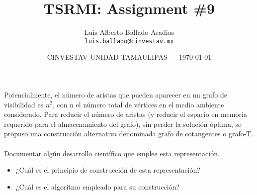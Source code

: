 \documentclass{article}
\title{TSRMI: Assignment \#9} %
\author{Luis Alberto Ballado Aradias\\ \texttt{luis.ballado@cinvestav.mx}} %
\date{CINVESTAV UNIDAD TAMAULIPAS --- \today} %
\begin{document}
\maketitle %



Potencialmente, el número de aristas que pueden aparecer en un grafo de visibilidad es $n^{2}$, con n el número total de vértices en el medio ambiente considerado. Para reducir el número de aristas (y reducir el espacio en memoria requerido para el almacenamiento del grafo), sin perder la solución óptima, se propuso una construcción alternativa denominada grafo de cotangentes o grafo-T. \\\\
Documentar algún desarrollo científico que emplee esta representación.

\begin{itemize}
  \item ¿Cuál es el principio de construcción de esta representación?
  \item ¿Cuál es el algoritmo empleado para su construcción?
\end{itemize}

\end{document}
